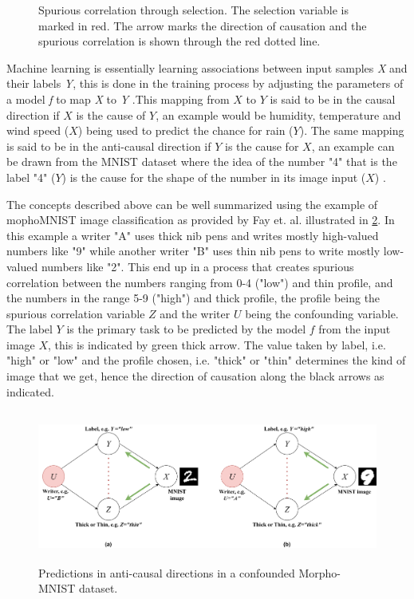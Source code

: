 \documentclass[12pt,DIV14,BCOR12mm,a4paper,footinclude=false,headinclude,parskip=half-,twoside,openright,cleardoublepage=empty,toc=index,bibliography=totoc,listof=totoc]{scrreprt}
\numberwithin{equation}{chapter}
\begin{document}
\begin{figure}[H]
    \centering
     
    \caption{Spurious correlation through selection. The selection variable is marked in red. The arrow marks the direction of causation and the spurious correlation is shown through the red dotted line.}
    \label{fig:selection}
\end{figure}

Machine learning is essentially learning associations between input samples \textit{X} and their labels \textit{Y}, this is done in the training process by adjusting the parameters of a model \textit{f} to map \textit{X} to \textit{Y} \cite{sanchez_2022_causal} \cite{DBLP:journals/corr/abs-2106-00545}.This mapping from $X$ to $Y$ is said to be in the causal direction if $X$ is the cause of $Y$, an example would be humidity, temperature and wind speed ($X$) being used to predict the chance for rain ($Y$). The same mapping is said to be in the anti-causal direction if $Y$ is the cause for $X$, an example can be drawn from the MNIST dataset where the idea of the number "4" that is the label "4" ($Y$) is the cause for the shape of the number in its image input ($X$) \cite{10162210}.   

The concepts described above can be well summarized using the example of mophoMNIST image classification as provided by Fay et. al. \cite{10162210} illustrated in \ref{fig:anti-causal_confounding}. In this example a writer "A" uses thick nib pens and writes mostly high-valued numbers like "9" while another writer "B" uses thin nib pens to write mostly low-valued numbers like "2". This end up in a process that creates spurious correlation between the numbers ranging from 0-4 ("low") and thin profile, and the numbers in the range 5-9 ("high") and thick profile, the profile being the spurious correlation variable $Z$ and the writer $U$ being the confounding variable. The label $Y$ is the primary task to be predicted by the model $f$ from the input image $X$, this is indicated by green thick arrow. The value taken by label, i.e. "high" or "low" and the profile chosen, i.e. "thick" or "thin" determines the kind of image that we get, hence the direction of causation along the black arrows as indicated. 

\begin{figure}[htbp]
    \centering
    \includegraphics[height=5cm]{thesis/figures/anti-causal_confounding_new.png} 
    \caption{Predictions in anti-causal directions in a confounded Morpho-MNIST dataset.}
    \label{fig:anti-causal_confounding}
\end{figure}
\end{document}
